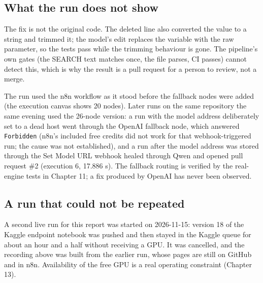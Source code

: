\subsection{What the run does not show}

The fix is not the original code. The deleted line also converted the value to a string and trimmed it; the model's edit replaces the variable with the raw parameter, so the tests pass while the trimming behaviour is gone. The pipeline's own gates (the SEARCH text matches once, the file parses, CI passes) cannot detect this, which is why the result is a pull request for a person to review, not a merge.

The run used the n8n workflow as it stood before the fallback nodes were added (the execution canvas shows 20 nodes). Later runs on the same repository the same evening used the 26-node version: a run with the model address deliberately set to a dead host went through the OpenAI fallback node, which answered \texttt{Forbidden} (n8n's included free credits did not work for that webhook-triggered run; the cause was not established), and a run after the model address was stored through the Set Model URL webhook healed through Qwen and opened pull request \#2 (execution 6, 17.886 s). The fallback routing is verified by the real-engine tests in Chapter 11; a fix produced by OpenAI has never been observed.

\subsection{A run that could not be repeated}

A second live run for this report was started on 2026-11-15: version 18 of the Kaggle endpoint notebook was pushed and then stayed in the Kaggle queue for about an hour and a half without receiving a GPU. It was cancelled, and the recording above was built from the earlier run, whose pages are still on GitHub and in n8n. Availability of the free GPU is a real operating constraint (Chapter 13).
